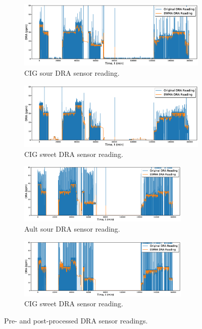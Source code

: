 \begin{figure}[h]
     \centering
     \begin{subfigure}[b]{0.9\textwidth}
         \centering
         \includegraphics[width=\textwidth]{images/08CIGSour.eps}
         \caption{CIG sour DRA sensor reading.}
         \label{fig:08CIGSour}
     \end{subfigure}
     \hfill
     \begin{subfigure}[b]{0.9\textwidth}
         \centering
         \includegraphics[width=\textwidth]{images/08CIGSweet.eps}
         \caption{CIG sweet DRA sensor reading.}
         \label{fig:08CIGSweet}
     \end{subfigure}
          \begin{subfigure}[b]{1\textwidth}
         \centering
         \includegraphics[width=0.9\textwidth]{images/08AultSour.eps}
         \caption{Ault sour DRA sensor reading.}
         \label{fig:08AultSour}
     \end{subfigure}
     \hfill
     \begin{subfigure}[b]{1\textwidth}
         \centering
         \includegraphics[width=0.9\textwidth]{images/08AultSweet.eps}
         \caption{CIG sweet DRA sensor reading.}
         \label{fig:08AultSweet}
     \end{subfigure}
        \caption{Pre- and post-processed DRA sensor readings.}
        \label{fig:08DRA}
\end{figure}

